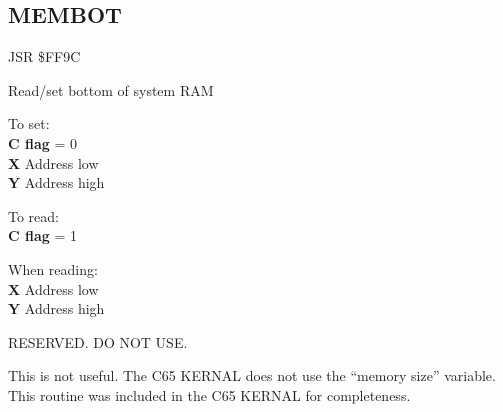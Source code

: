 
\newpage
\subsection{MEMBOT}
\label{KERNAL Jump Table!MEMBOT}
\begin{description}[leftmargin=2cm,style=nextline]
    \item [Address:] JSR \$FF9C
    \item [Description:] Read/set bottom of system RAM
    \item [Inputs:]
        To set: \\
        \textbf{C flag} = 0 \\
        \textbf{X} Address low \\
        \textbf{Y} Address high

        To read: \\
        \textbf{C flag} = 1
    \item [Outputs:]
        When reading: \\
        \textbf{X} Address low \\
        \textbf{Y} Address high
    \item [Remarks:]
        RESERVED. DO NOT USE.

        This is not useful. The C65 KERNAL does not use the ``memory size'' variable. This routine was included in the C65 KERNAL for completeness.
    \item [Example:]
\end{description}



\newpage
